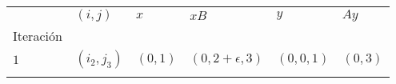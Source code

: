 \begin{tabular}{llllll}
    \toprule
    {} &       $(i, j)$ &              $x$ &                    $xB$ &                     $y$ &             $Ay$ \\
    Iteración &                &                  &                         &                         &                  \\
    \midrule
    $1$         &  $(i_2, j_3)$ &  $(0, 1)$ &  $(0, 2 + \epsilon, 3)$ &  $(0, 0, 1)$ &  $(0 , 3)$\\
    \bottomrule
    \\
    \end{tabular}